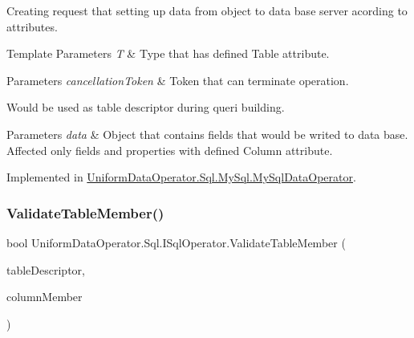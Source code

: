 Creating request that setting up data from object to data base server acording to attributes. 


\begin{DoxyTemplParams}{Template Parameters}
{\em T} & Type that has defined Table attribute. 
\begin{DoxyParams}{Parameters}
{\em cancellation\+Token} & Token that can terminate operation.\\
\hline
\end{DoxyParams}
Would be used as table descriptor during queri building.\\
\hline
\end{DoxyTemplParams}

\begin{DoxyParams}{Parameters}
{\em data} & Object that contains fields that would be writed to data base. Affected only fields and properties with defined Column attribute.\\
\hline
\end{DoxyParams}


Implemented in \mbox{\hyperlink{class_uniform_data_operator_1_1_sql_1_1_my_sql_1_1_my_sql_data_operator_a31e1837ecb4c58bbd39a31fa9cf51962}{Uniform\+Data\+Operator.\+Sql.\+My\+Sql.\+My\+Sql\+Data\+Operator}}.

\mbox{\label{interface_uniform_data_operator_1_1_sql_1_1_i_sql_operator_a3b5fbe97e664e1ef689576ab8757f957}} 
\subsubsection{\texorpdfstring{Validate\+Table\+Member()}{ValidateTableMember()}}
{\footnotesize\ttfamily bool Uniform\+Data\+Operator.\+Sql.\+I\+Sql\+Operator.\+Validate\+Table\+Member (\begin{DoxyParamCaption}\item[{\mbox{\hyperlink{class_uniform_data_operator_1_1_sql_1_1_tables_1_1_attributes_1_1_table}{Table}}}]{table\+Descriptor,  }\item[{Member\+Info}]{column\+Member }\end{DoxyParamCaption})}



